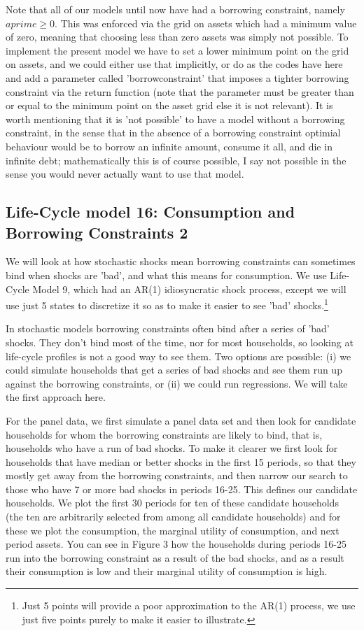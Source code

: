 Note that all of our models until now have had a borrowing constraint, namely $aprime\geq 0$. This was enforced via the grid on assets which had a minimum value of zero, meaning that choosing less than zero assets was simply not possible. To implement the present model we have to set a lower minimum point on the grid on assets, and we could either use that implicitly, or do as the codes have here and add a parameter called 'borrowconstraint' that imposes a tighter borrowing constraint via the return function (note that the parameter must be greater than or equal to the minimum point on the asset grid else it is not relevant). It is worth mentioning that it is 'not possible' to have a model without a borrowing constraint, in the sense that in the absence of a borrowing constraint optimial behaviour would be to borrow an infinite amount, consume it all, and die in infinite debt; mathematically this is of course possible, I say not possible in the sense you would never actually want to use that model.


\subsection{Life-Cycle model 16: Consumption and Borrowing Constraints 2}
We will look at how stochastic shocks mean borrowing constraints can sometimes bind when shocks are 'bad', and what this means for consumption. We use Life-Cycle Model 9, which had an AR(1) idiosyncratic shock process, except we will use just 5 states to discretize it so as to make it easier to see 'bad' shocks.\footnote{Just 5 points will provide a poor approximation to the AR(1) process, we use just five points purely to make it easier to illustrate.}

In stochastic models borrowing constraints often bind after a series of 'bad' shocks. They don't bind most of the time, nor for most households, so looking at life-cycle profiles is not a good way to see them. Two options are possible: (i) we could simulate households that get a series of bad shocks and see them run up against the borrowing constraints, or (ii) we could run regressions. We will take the first approach here.

For the panel data, we first simulate a panel data set and then look for candidate households for whom the borrowing constraints are likely to bind, that is, households who have a run of bad shocks. To make it clearer we first look for households that have median or better shocks in the first 15 periods, so that they mostly get away from the borrowing constraints, and then narrow our search to those who have 7 or more bad shocks in periods 16-25. This defines our candidate households. We plot the first 30 periods for ten of these candidate households (the ten are arbitrarily selected from among all candidate households) and for these we plot the consumption, the marginal utility of consumption, and next period assets. You can see in Figure 3 how the households during periods 16-25 run into the borrowing constraint as a result of the bad shocks, and as a result their consumption is low and their marginal utility of consumption is high.

